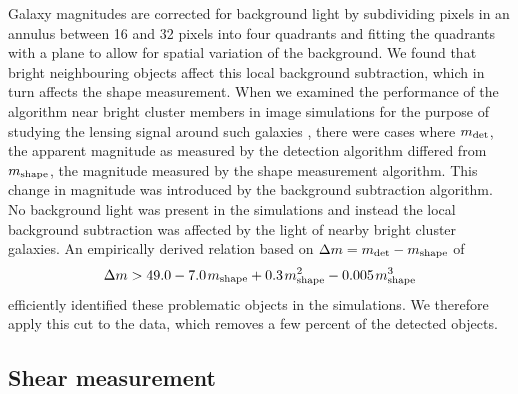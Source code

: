 \documentclass[useAMS,usenatbib]{mnras}
\begin{document}
Galaxy magnitudes are corrected for background light by subdividing pixels in an annulus between 16 and 32 pixels into four quadrants and fitting the quadrants with a plane to allow for spatial variation of the background. We found that bright neighbouring objects affect this local background subtraction, which in turn affects the shape measurement. When we examined the performance of the algorithm near bright cluster members in image simulations for the purpose of studying the lensing signal around such galaxies \citep{sifon18}, there were cases where $m_{\rm det}$, the apparent magnitude as measured by the detection algorithm differed from  $m_{\rm shape}$, the magnitude measured by the shape measurement algorithm. This change in magnitude was introduced by the background subtraction algorithm. No background light was present in the simulations and instead the local background subtraction was affected by the light of nearby bright cluster galaxies. An empirically derived relation based on  $\Delta m=m_{\rm det}-m_{\rm shape}$ of 
\begin{equation}
\Delta m > 49.0 -7.0 \hspace{1pt} m_{\rm shape} +0.3 \hspace{1pt} m_{\rm shape}^2 -0.005 \hspace{1pt} m_{\rm shape}^3
\label{eq:delmag}
\end{equation} 
efficiently identified these problematic objects in the simulations. We therefore apply this cut to the data, which removes a few percent of the detected objects. 

\subsection{Shear measurement}
\end{document}
